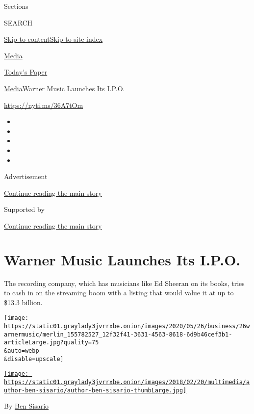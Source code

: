 Sections

SEARCH

\protect\hyperlink{site-content}{Skip to
content}\protect\hyperlink{site-index}{Skip to site index}

\href{https://www.nytimes3xbfgragh.onion/section/business/media}{Media}

\href{https://myaccount.nytimes3xbfgragh.onion/auth/login?response_type=cookie\&client_id=vi}{}

\href{https://www.nytimes3xbfgragh.onion/section/todayspaper}{Today's
Paper}

\href{/section/business/media}{Media}\textbar{}Warner Music Launches Its
I.P.O.

\url{https://nyti.ms/36A7tOm}

\begin{itemize}
\item
\item
\item
\item
\item
\end{itemize}

Advertisement

\protect\hyperlink{after-top}{Continue reading the main story}

Supported by

\protect\hyperlink{after-sponsor}{Continue reading the main story}

\hypertarget{warner-music-launches-its-ipo}{%
\section{Warner Music Launches Its
I.P.O.}\label{warner-music-launches-its-ipo}}

The recording company, which has musicians like Ed Sheeran on its books,
tries to cash in on the streaming boom with a listing that would value
it at up to \$13.3 billion.

\texttt{[image: https://static01.graylady3jvrrxbe.onion/images/2020/05/26/business/26warnermusic/merlin\_155782527\_12f32f41-3631-4563-8618-6d9b46cef3b1-articleLarge.jpg?quality=75\\\&auto=webp\\\&disable=upscale]}

\href{https://www.nytimes3xbfgragh.onion/by/ben-sisario}{\texttt{[image: https://static01.graylady3jvrrxbe.onion/images/2018/02/20/multimedia/author-ben-sisario/author-ben-sisario-thumbLarge.jpg]}}

By \href{https://www.nytimes3xbfgragh.onion/by/ben-sisario}{Ben Sisario}

